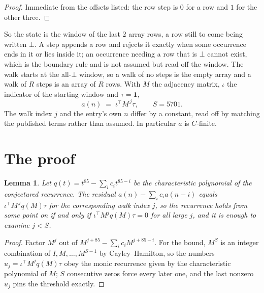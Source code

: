 \documentclass[11pt,a4paper]{article}
\theoremstyle{plain}
\newtheorem{lemma}[theorem]{Lemma}
\theoremstyle{definition}
\begin{document}
\begin{proof}
Immediate from the offsets listed: the row step is $0$ for a row and $1$ for the other three.
\end{proof}

So the state is the window of the last $2$ array rows, a row still to come being written
$\bot$. A step appends a row and rejects it exactly when some occurrence ends in it or lies
inside it; an occurrence needing a row that is $\bot$ cannot exist, which is the boundary rule
and is not assumed but read off the window. The walk starts at the all-$\bot$ window, so a walk
of no steps is the empty array and a walk of $R$ steps is an array of $R$ rows. With $M$ the
adjacency matrix, $\iota$ the indicator of the starting window and $\tau=\mathbf{1}$,
\[
a(n)\;=\;\iota^{\!\top}M^{\,j}\tau ,\qquad S=5701.
\]
The walk index $j$ and the entry's own $n$ differ by a constant, read off by matching the
published terms rather than assumed. In particular $a$ is $C$-finite.

\section{The proof}

\begin{lemma}\label{lem:crit}
Let $q(t)=t^{85}-\sum_i c_it^{85-i}$ be the characteristic polynomial of the
conjectured recurrence. The residual $a(n)-\sum_ic_ia(n-i)$ equals
$\iota^{\!\top}M^{\,j}q(M)\tau$ for the corresponding walk index $j$, so the recurrence
holds from some point on if and only if $\iota^{\!\top}M^{j}q(M)\tau=0$ for all large $j$,
and it is enough to examine $j<S$.
\end{lemma}

\begin{proof}
Factor $M^{j}$ out of $M^{j+85}-\sum_ic_iM^{j+85-i}$. For the bound, $M^{S}$
is an integer combination of $I,M,\dots,M^{S-1}$ by Cayley--Hamilton, so the numbers
$u_j=\iota^{\!\top}M^{j}q(M)\tau$ obey the monic recurrence given by the characteristic
polynomial of $M$; $S$ consecutive zeros force every later one, and the last nonzero $u_j$
pins the threshold exactly.
\end{proof}
\end{document}
